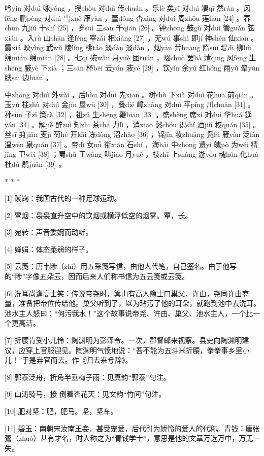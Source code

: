\documentclass[12pt,UTF8]{ctexbook}
\begin{document}
吟yín 对duì 咏yǒng ，授shòu 对duì 传chuán 。乐lè 矣yǐ 对duì 凄qī 然rán 。风fēng 鹏péng 对duì 雪xuě 雁yàn ，董dǒng 杏xìng 对duì 周zhōu 莲lián [24] 。春chūn 九jiǔ 十shí [25] ，岁suì 三sān 千qiān [26] 。钟zhōng 鼓gǔ 对duì 管guǎn 弦xián 。入rù 山shān 逢féng 宰zǎi 相xiàng [27] ，无wú 事shì 即jí 神shén 仙xian 。霞xiá 映yìng 武wǔ 陵líng 桃táo 淡dàn 淡dàn ，烟yān 荒huāng 隋suí 堤dī 柳liǔ 绵mián 绵mián [28] 。七qī 碗wǎn 月yuè 团tuán ，啜chuò 罢bà 清qīng 风fēng 生shēng 腋yè 下xià ；三sān 杯bēi 云yún 液yè [29] ，饮yǐn 余yú 红hóng 雨yǔ 晕yùn 腮sāi 边biān 。

中zhōng 对duì 外wài ，后hòu 对duì 先xiān 。树shù 下xià 对duì 花huā 前qián 。玉yù 柱zhù 对duì 金jīn 屋wū [30] ，叠dié 嶂zhàng 对duì 平píng 川chuān [31] 。孙sūn 子zǐ 策cè [32] ，祖zǔ 生shēng 鞭biān [33] 。盛shèng 席xí 对duì 华huá 筵yán [34] 。解jiě 醉zuì 知zhī 茶chá 力lì ，消xiāo 愁chóu 识shí 酒jiǔ 权quán [35] 。丝sī 剪jiǎn 芰jì 荷hé 开kāi 冻dòng 沼zhǎo [36] ，锦jǐn 妆zhuāng 凫fú 雁yàn 泛fàn 温wēn 泉quán [37] 。帝dì 女nǚ 衔xián 石shí ，海hǎi 中zhōng 遗yí 魄pò 为wéi 精jīng 卫wèi [38] ；蜀shǔ 王wáng 叫jiào 月yuè ，枝zhī 上shàng 游yóu 魂hún 化huà 杜dù 鹃juān [39] 。



* * *



[1] 蹴踘：我国古代的一种足球运动。

[2] 覃烟：袅袅直升空中的饮烟或横浮低空的烟雾。覃，长。

[3] 宛转：声音委婉而动听。

[4] 婵娟：体态柔弱的样子。

[5] 云笺：唐韦陟（zhì）用五采笺写信，由他人代笔，自己签名。由于他写的“陟”字像五朵云，因而后来人们称书信为五云笺或云笺。

[6] 洗耳尚逢高士笑：传说帝尧时，箕山有高人隐士曰巢父、许由，尧同许由商量，准备把帝位传给他。巢父听到了，以为玷污了他的耳朵，就跑到池中去洗耳。池水主人怒曰：“何污我水！”这个故事说帝尧、许由、巢父、池水主人，一个比一个更高洁。

[7] 折腰肯受小儿怜：陶渊明为彭泽令。一次，郡督邮来视察。县吏向陶渊明建议，应穿上官服迎见。陶渊明气愤地说：“吾不能为五斗米折腰，拳拳事乡里小儿！”于是弃官而去。作《归去来兮辞》。

[8] 郭泰泛舟，折角半垂梅子雨：见真韵“郭泰”句注。

[9] 山涛骑马，接 倒着杏花天：见文韵“竹间”句注。

[10] 肥对坚：肥，肥马。坚，坚车。

[11] 碧玉：南朝宋汝南王妾，甚受宠爱，后代引为娇怜的爱人的代称。青钱：唐张鷟（zhuó）甚有才名，时人称之为“青钱学士”，意思是他的文章万选万中，万无一失。
\end{document}
